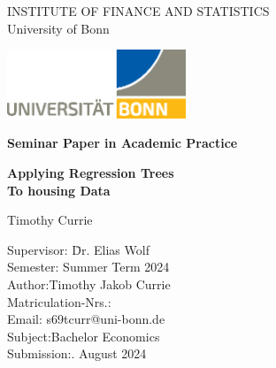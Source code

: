\thispagestyle{empty}

\begin{center}

\vspace*{-8mm}

{\LARGE INSTITUTE OF FINANCE AND STATISTICS\\[1mm]}
\large University of Bonn\\

\vspace*{1cm}

\includegraphics[width=0.4\textwidth]{./Graphics/UNI_Bonn_Logo_Standard_RZ.eps}

\vspace*{1cm}

{\Large \textbf{Seminar Paper in Academic Practice}}\\ 

\vspace{1cm}

{\Large \textbf{Applying Regression Trees}}\\ 
\vspace*{1mm}
{\Large \textbf{To housing Data}}\\ 

\vspace{1.5cm}

{\LARGE Timothy Currie}\\[15mm]

\parbox{120mm}{
\begin{large}
\begin{tabbing}
Supervisor: \hspace{1.8cm} \= Dr. Elias Wolf\\[1.5mm]
Semester:\> Summer Term 2024\\[1.5mm]
Author:\>Timothy Jakob Currie\\[1.5mm] %
Matriculation-Nrs.:\\[1.5mm]
Email:\> s69tcurr@uni-bonn.de\\[1.5mm]
Subject:\>Bachelor Economics\\[1.5mm]
Submission:. August 2024\\[1.5mm]
\end{tabbing}
\end{large}
}

\end{center}
\clearpage{\pagestyle{empty}\cleardoublepage}
